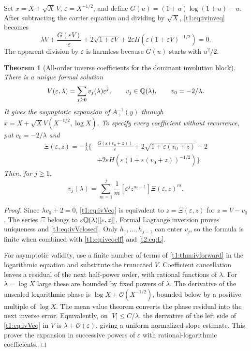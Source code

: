 \documentclass[11pt,openany]{book}
\numberwithin{equation}{chapter}
\theoremstyle{plain}
\newtheorem{theorem}{Theorem}[chapter]
\theoremstyle{definition}
\theoremstyle{remark}
\newcommand{\OO}{\mathcal O}\newcommand{\bigO}{\mathcal O}
\newcommand{\coefA}[1]{\left[#1\right]}       %
\begin{document}
Set $x=X+\sqrt X\,V$, $\varepsilon=X^{-1/2}$, and define
$G(u)=(1+u)\log(1+u)-u$. After subtracting the carrier equation and dividing by $\sqrt X$, \eqref{t1:eq:ivinveq} becomes
\begin{equation}
 \lambda V+\frac{G(\varepsilon V)}{\varepsilon}
 +2\sqrt{1+\varepsilon V}
 +2\varepsilon H\!\left(\varepsilon(1+\varepsilon V)^{-1/2}\right)=0.
 \label{t1:eq:ivVeq}
\end{equation}
The apparent division by $\varepsilon$ is harmless because $G(u)$ starts with $u^2/2$.

\begin{theorem}[All-order inverse coefficients for the dominant involution block]\label{t1:thm:ivinverse}
There is a unique formal solution
\begin{equation}
 V(\varepsilon,\lambda)=\sum_{j\ge0}v_j(\lambda)\varepsilon^j,
 \qquad v_j\in\mathbb Q(\lambda),\qquad v_0=-2/\lambda.
 \label{t1:eq:ivV}
\end{equation}
It gives the asymptotic expansion of $A_+^{-1}(y)$ through
$x=X+\sqrt X V(X^{-1/2},\log X)$. To specify every coefficient without recurrence, put $v_0=-2/\lambda$ and
\begin{align}
 \Xi(\varepsilon,z)=-\frac1\lambda\Bigg\{&
 \frac{G(\varepsilon(v_0+z))}{\varepsilon}
 +2\sqrt{1+\varepsilon(v_0+z)}-2\nonumber\\
 &+2\varepsilon H\!\left(\varepsilon(1+\varepsilon(v_0+z))^{-1/2}\right)\Bigg\}.
 \label{t1:eq:ivXi}
\end{align}
Then, for $j\ge1$,
\begin{equation}
 v_j(\lambda)=\sum_{m=1}^j\frac1m
 \coefA{\varepsilon^j z^{m-1}}\Xi(\varepsilon,z)^m.
 \label{t1:eq:ivVclosed}
\end{equation}
\end{theorem}
\begin{proof}
Since $\lambda v_0+2=0$, \eqref{t1:eq:ivVeq} is equivalent to $z=\Xi(\varepsilon,z)$ for $z=V-v_0$. The series $\Xi$ belongs to $\varepsilon\mathbb Q(\lambda)[[\varepsilon,z]]$. Formal Lagrange inversion proves uniqueness and \eqref{t1:eq:ivVclosed}. Only $h_1,\ldots,h_{j-1}$ can enter $v_j$, so the formula is finite when combined with \eqref{t1:eq:ivcoeff} and \eqref{t2:eq:L}.

For asymptotic validity, use a finite number of terms of \cref{t1:thm:ivforward} in the logarithmic equation and substitute the truncated $V$. Coefficient cancellation leaves a residual of the next half-power order, with rational functions of $\lambda$. For $\lambda=\log X$ large these are bounded by fixed powers of $\lambda$. The derivative of the unscaled logarithmic phase is $\log X+\OO(X^{-1/2})$, bounded below by a positive multiple of $\log X$. The mean value theorem converts the phase residual into the next inverse error. Equivalently, on $|V|\le C/\lambda$, the derivative of the left side of \eqref{t1:eq:ivVeq} in $V$ is $\lambda+\OO(\varepsilon)$, giving a uniform normalized-slope estimate. This proves the expansion in successive powers of $\varepsilon$ with rational-logarithmic coefficients.
\end{proof}
\end{document}
